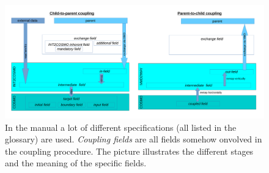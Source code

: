 \documentclass[11pt,twoside]{article}
\begin{document}
\begin{appendix}
\begin{itemize}
\end{itemize}
\begin{figure}
\begin{center} 
\vspace{-.3cm}
\includegraphics[width=0.9\textheight,angle=90]{MMDUM_fieldflow.pdf} 
\end{center} 
\vspace{-.8cm}
\caption{In the manual a lot of different specifications (all listed
in the glossary) are used. {\it Coupling fields} are all fields
somehow onvolved in the coupling procedure. The picture illustrates
the different stages and the meaning of the specific fields.}
\label{fig:fields} 
\end{figure} 

\end{appendix}

\clearpage

\end{document}
